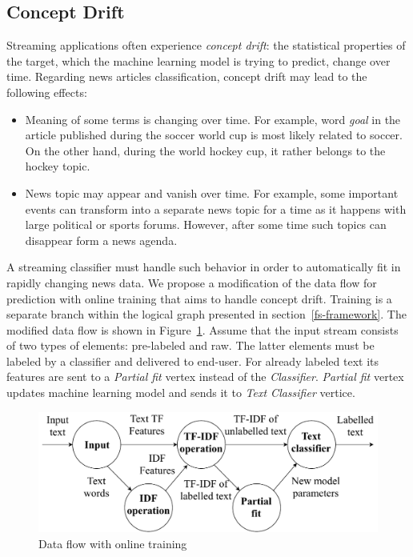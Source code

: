 \subsection{Concept Drift}

Streaming applications often experience {\em concept drift}: the statistical properties of the target, which the machine learning model is trying to predict, change over time. Regarding news articles classification, concept drift may lead to the following effects:

\begin{itemize}
    \item Meaning of some terms is changing over time. For example, word {\em goal} in the article published during the soccer world cup is most likely related to soccer. On the other hand, during the world hockey cup, it rather belongs to the hockey topic.
    \item News topic may appear and vanish over time. For example, some important events can transform into a separate news topic for a time as it happens with large political or sports forums. However, after some time such topics can disappear form a news agenda.
\end{itemize}

A streaming classifier must handle such behavior in order to automatically fit in rapidly changing news data. We propose a modification of the data flow for prediction with online training that aims to handle concept drift. Training is a separate branch within the logical graph presented in section~\ref{fs-framework}. The modified data flow is shown in Figure~\ref{training_graph}. Assume that the input stream consists of two types of elements: pre-labeled and raw. The latter elements must be labeled by a classifier and delivered to end-user. For already labeled text its features are sent to a {\em Partial fit} vertex instead of the {\em Classifier}. {\em Partial fit} vertex updates machine learning model and sends it to {\em Text Classifier} vertice.

\begin{figure}[htbp]
  \centering
  \includegraphics[scale=0.38]{pics/logical-graph}
  \caption{Data flow with online training}
  \label {training_graph}
\end{figure}

